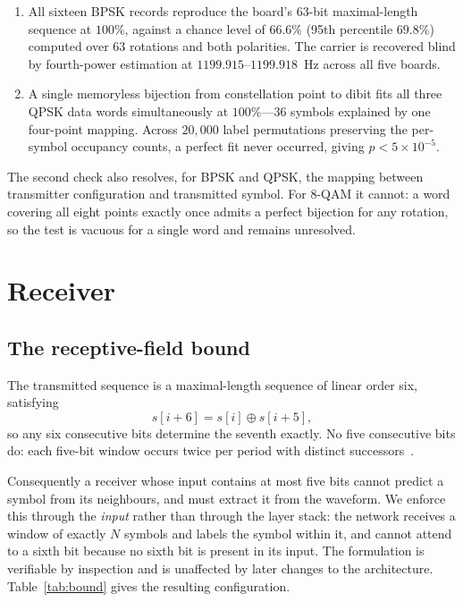 \documentclass[journal]{IEEEtran}   %
\begin{document}
\begin{enumerate}
\item All sixteen BPSK records reproduce the board's 63-bit maximal-length
sequence at $100\%$, against a chance level of $66.6\%$ (95th percentile
$69.8\%$) computed over 63 rotations and both polarities. The carrier is
recovered blind by fourth-power estimation at $1199.915$--$1199.918$~Hz across
all five boards.
\item A single memoryless bijection from constellation point to dibit fits all
three QPSK data words simultaneously at $100\%$---36 symbols explained by one
four-point mapping. Across $20{,}000$ label permutations preserving the
per-symbol occupancy counts, a perfect fit never occurred, giving
$p < 5\times10^{-5}$.
\end{enumerate}

The second check also resolves, for BPSK and QPSK, the mapping between
transmitter configuration and transmitted symbol. For 8-QAM it cannot: a word
covering all eight points exactly once admits a perfect bijection for any
rotation, so the test is vacuous for a single word and remains unresolved.

\section{Receiver}

\subsection{The receptive-field bound}
\label{sec:bound}
The transmitted sequence is a maximal-length sequence of linear order six,
satisfying
\begin{equation}
s[i+6] = s[i] \oplus s[i+5],
\label{eq:lfsr}
\end{equation}
so any six consecutive bits determine the seventh exactly. No five consecutive
bits do: each five-bit window occurs twice per period with distinct
successors~\cite{golomb1982shift}.

Consequently a receiver whose input contains at most five bits cannot predict a
symbol from its neighbours, and must extract it from the waveform. We enforce
this through the \emph{input} rather than through the layer stack: the network
receives a window of exactly $N$ symbols and labels the symbol within it, and
cannot attend to a sixth bit because no sixth bit is present in its input. The
formulation is verifiable by inspection and is unaffected by later changes to
the architecture. Table~\ref{tab:bound} gives the resulting configuration.
\end{document}
